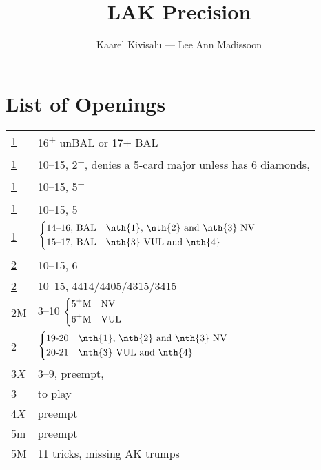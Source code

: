 \documentclass[11pt]{article}
\title{LAK Precision}
\author{Kaarel Kivisalu --- Lee Ann Madissoon}
\renewcommand{\C}{\texorpdfstring{\textcolor{ForestGreen}{\raisebox{-0.017em}{\ensuremath{\varclub}}}}{C}}
\newcommand{\D}{\texorpdfstring{\textcolor{YellowOrange}{\raisebox{-0.35pt}{\ensuremath{\vardiamond}}}}{D}}
\renewcommand{\H}{\texorpdfstring{\textcolor{Red}{\raisebox{-0.06em}{\ensuremath{\varheart}}}}{H}}
\renewcommand{\S}{\texorpdfstring{\raisebox{-0.03em}{\ensuremath{\varspade}}}{S}}
\newcommand{\N}{\texorpdfstring{\textcolor{Cerulean}{\raisebox{0.15em}{\scalebox{0.72}{\ensuremath{\bigodot}}}}}{NT}}
\newcommand{\+}{\textsuperscript{+}}
\newcommand{\m}{m}
\newcommand{\M}{M}
\newenvironment{bidtable}{%
	\begin{tabular}{l l}%
}{%
	\end{tabular}%
}
\begin{document}
\maketitle

\tableofcontents

\section{List of Openings}

\begin{bidtable}
    \hyperref[sec:1C]{1\C} & 16\+ unBAL or 17+ BAL \\
    \hyperref[sec:1D]{1\D} & 10--15, 2\+\D, denies a 5-card major unless has 6 diamonds, \\
    \hyperref[sec:1H]{1\H} & 10--15, 5\+\H \\
    \hyperref[sec:1S]{1\S} & 10--15, 5\+\S \\
    \hyperref[sec:1N]{1\N} & $\begin{dcases}
        \text{14--16, BAL} & \text{\nth{1}, \nth{2} and \nth{3} NV}\\
        \text{15--17, BAL} & \text{\nth{3} VUL and \nth{4}} \\
    \end{dcases}$\\
    \hyperref[sec:2C]{2\C} & 10--15, 6\+\C \\
    \hyperref[sec:2D]{2\D} & 10--15, 4414/4405/4315/3415 \\
    2\M & 3--10 $\begin{dcases}
        \text{5\+\M} & \text{NV}\\
        \text{6\+\M} & \text{VUL}\\
    \end{dcases}$\\
    2\N & $\begin{dcases}
        \text{19-20} & \text{\nth{1}, \nth{2} and \nth{3} NV}\\
        \text{20-21} & \text{\nth{3} VUL and \nth{4}} \\
    \end{dcases}$\\
    3$X$ & 3--9, preempt, \\
    3\N & to play \\
    4$X$ & preempt \\
    5\m & preempt \\
    5\M & 11 tricks, missing AK trumps \\
\end{bidtable}
\end{document}
